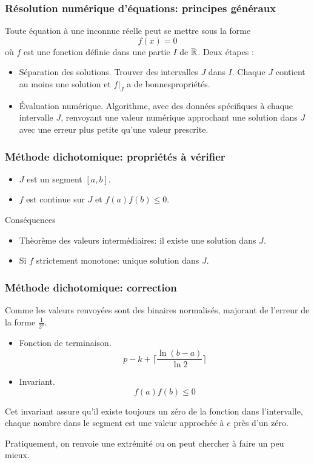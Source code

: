 
\lstset{language=Python,frame=single}

\begin{frame}
  \frametitle{Résolution numérique d'équations: principes généraux}
Toute équation à une inconnue réelle peut se mettre sous la forme
\begin{displaymath}
  f(x) = 0
\end{displaymath}
où $f$ est une fonction définie dans une partie $I$ de $\mathbb{R}$. Deux étapes :
\begin{itemize}
  \item Séparation des solutions.\newline
Trouver des intervalles $J$ dans $I$. Chaque $J$ contient au moins une solution et $f|_J$ a de \og bonnes\fg  propriétés.
  \item \'Evaluation numérique. \newline
  Algorithme, avec des données spécifiques à chaque intervalle $J$, renvoyant une valeur numérique approchant une solution dans $J$ avec une erreur plus petite qu'une valeur prescrite.
\end{itemize} 
\end{frame}

\begin{frame}
  \frametitle{Méthode dichotomique: propriétés à vérifier}
\begin{itemize}
  \item $J$ est un segment $[a,b]$.
  \item $f$ est continue sur $J$ et $f(a)f(b)\leq 0$. 
\end{itemize}
Conséquences
\begin{itemize}
  \item Thèorème des valeurs intermédiaires: il existe une solution dans $J$.
  \item Si $f$ strictement monotone: unique solution dans $J$. 
\end{itemize}
\end{frame}

\begin{frame}
  \frametitle{Méthode dichotomique: correction}
Comme les valeurs renvoyées sont des binaires normalisés, majorant de l'erreur de la forme $\frac{1}{2^p}$.
\begin{itemize}
  \item Fonction de terminaison.
\begin{displaymath}
p-k + \lceil \frac{\ln(b-a)}{\ln 2}\rceil  
\end{displaymath}
  \item Invariant.
\begin{displaymath}
  f(a)f(b)\leq 0
\end{displaymath}
\end{itemize}

Cet invariant assure qu'il existe toujours un zéro de la fonction dans l'intervalle, chaque nombre dans le segment est une valeur approchée à $e$ près d'un zéro.

Pratiquement, on renvoie une extrémité ou on peut chercher à faire un peu mieux.
\end{frame}

